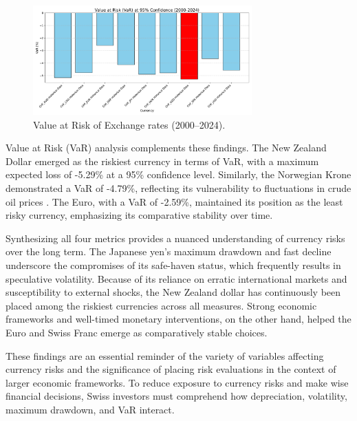\documentclass[11pt,a4paper,english,oneside]{book}
\begin{document}
\begin{figure}[h!]
    \centering
    \includegraphics[width=0.75\textwidth]{../../images/var_2000_2024.pdf}
    \caption{Value at Risk of Exchange rates (2000--2024).}
    \label{fig:var_2000_2024}
\end{figure}

Value at Risk (VaR) analysis complements these findings. The New Zealand Dollar emerged as the riskiest currency in terms of VaR, with a maximum expected loss of -5.29\% at a 95\% confidence level. Similarly, the Norwegian Krone demonstrated a VaR of -4.79\%, reflecting its vulnerability to fluctuations in crude oil prices \parencite{bergholt2016business}. The Euro, with a VaR of -2.59\%, maintained its position as the least risky currency, emphasizing its comparative stability over time.

Synthesizing all four metrics provides a nuanced understanding of currency risks over the long term. The Japanese yen's maximum drawdown and fast decline underscore the compromises of its safe-haven status, which frequently results in speculative volatility. Because of its reliance on erratic international markets and susceptibility to external shocks, the New Zealand dollar has continuously been placed among the riskiest currencies across all measures. Strong economic frameworks and well-timed monetary interventions, on the other hand, helped the Euro and Swiss Franc emerge as comparatively stable choices.

These findings are an essential reminder of the variety of variables affecting currency risks and the significance of placing risk evaluations in the context of larger economic frameworks. To reduce exposure to currency risks and make wise financial decisions, Swiss investors must comprehend how depreciation, volatility, maximum drawdown, and VaR interact.
\end{document}
